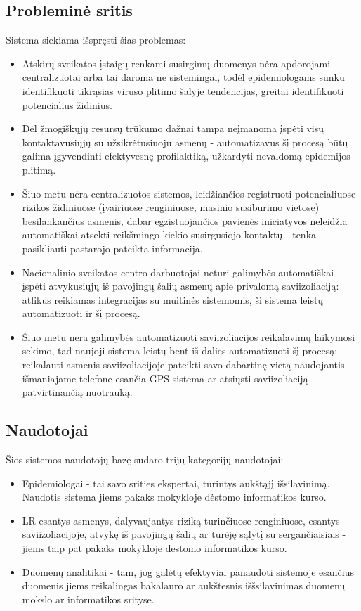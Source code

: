 \documentclass{VUMIFPSkursinis}
\begin{document}
\subsection{Probleminė sritis}
Sistema siekiama išspręsti šias problemas:
\begin{itemize}
	\item Atskirų sveikatos įstaigų renkami susirgimų duomenys nėra apdorojami centralizuotai
	      arba tai daroma ne sistemingai, todėl epidemiologams sunku identifikuoti tikrąsias viruso
	      plitimo šalyje tendencijas, greitai identifikuoti potencialius židinius.
	\item Dėl žmogiškųjų resursų trūkumo dažnai tampa neįmanoma įspėti visų kontaktavusiųjų
	      su užsikrėtusiuoju asmenų - automatizavus šį procesą būtų galima įgyvendinti efektyvesnę
	      profilaktiką, užkardyti nevaldomą epidemijos plitimą.
	\item Šiuo metu nėra centralizuotos sistemos, leidžiančios registruoti potencialiuose
	      rizikos židiniuose (įvairiuose renginiuose, masinio susibūrimo vietose) besilankančius
	      asmenis, dabar egzistuojančios pavienės iniciatyvos neleidžia automatiškai atsekti reikšmingo kiekio susirgusiojo kontaktų - tenka pasikliauti pastarojo pateikta informacija.
	\item Nacionalinio sveikatos centro darbuotojai neturi galimybės automatiškai įspėti
	      atvykusiųjų iš pavojingų šalių asmenų apie privalomą saviizoliaciją: atlikus reikiamas
	      integracijas su muitinės sistemomis, ši sistema leistų automatizuoti ir šį procesą.
	\item Šiuo metu nėra galimybės automatizuoti saviizoliacijos reikalavimų laikymosi sekimo,
	      tad naujoji sistema leistų bent iš dalies automatizuoti šį procesą: reikalauti asmenis
	      saviizoliacijoje pateikti savo dabartinę vietą naudojantis išmaniajame telefone esančia
	      GPS sistema ar atsiųsti saviizoliaciją patvirtinančią nuotrauką.
\end{itemize}

\subsection{Naudotojai}
Šios sistemos naudotojų bazę sudaro trijų kategorijų naudotojai:
\begin{itemize}
	\item Epidemiologai - tai savo srities ekspertai, turintys aukštąjį išsilavinimą.
	      Naudotis sistema jiems pakaks mokykloje dėstomo informatikos kurso.
	\item LR esantys asmenys, dalyvaujantys riziką turinčiuose renginiuose, esantys saviizoliacijoje,
	      atvykę iš pavojingų šalių ar turėję sąlytį su sergančiaisiais - jiems taip pat pakaks
	      mokykloje dėstomo informatikos kurso.
	\item Duomenų analitikai - tam, jog galėtų efektyviai panaudoti sistemoje
	      esančius duomenis jiems reikalingas bakalauro ar aukštesnis iššsilavinimas
	      duomenų mokslo ar informatikos srityse.
\end{itemize}
\end{document}
